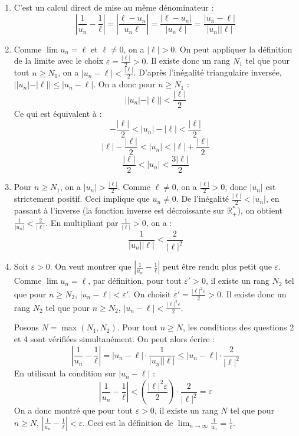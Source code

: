 \documentclass[]{exercices}
\begin{document}
\begin{solution}
	\begin{enumerate}
		\item C'est un calcul direct de mise au même dénominateur :
		      \[ \left|\frac{1}{u_n} - \frac{1}{\ell}\right| = \left|\frac{\ell - u_n}{u_n \ell}\right| = \frac{|\ell - u_n|}{|u_n \ell|} = \frac{|u_n - \ell|}{|u_n||\ell|} \]
		\item Comme $\lim u_n = \ell$ et $\ell \ne 0$, on a $|\ell|>0$. On peut appliquer la définition de la limite avec le choix $\varepsilon = \frac{|\ell|}{2} > 0$.
		      Il existe donc un rang $N_1$ tel que pour tout $n \ge N_1$, on a $|u_n - \ell| < \frac{|\ell|}{2}$.
		      D'après l'inégalité triangulaire inversée, $||u_n|-|\ell|| \le |u_n - \ell|$.
		      On a donc pour $n \ge N_1$ :
		      \[ ||u_n|-|\ell|| < \frac{|\ell|}{2} \]
		      Ce qui est équivalent à :
		      \[ -\frac{|\ell|}{2} < |u_n|-|\ell| < \frac{|\ell|}{2} \]
		      \[ |\ell| - \frac{|\ell|}{2} < |u_n| < |\ell| + \frac{|\ell|}{2} \]
		      \[ \frac{|\ell|}{2} < |u_n| < \frac{3|\ell|}{2} \]
		\item Pour $n \ge N_1$, on a $|u_n| > \frac{|\ell|}{2}$. Comme $\ell \ne 0$, on a $\frac{|\ell|}{2} > 0$, donc $|u_n|$ est strictement positif. Ceci implique que $u_n \ne 0$.
		      De l'inégalité $\frac{|\ell|}{2} < |u_n|$, en passant à l'inverse (la fonction inverse est décroissante sur $\mathbb{R}_+^*$), on obtient $\frac{1}{|u_n|} < \frac{2}{|\ell|}$.
		      En multipliant par $\frac{1}{|\ell|} > 0$, on a :
		      \[ \frac{1}{|u_n||\ell|} < \frac{2}{|\ell|^2} \]
		\item Soit $\varepsilon > 0$. On veut montrer que $|\frac{1}{u_n} - \frac{1}{\ell}|$ peut être rendu plus petit que $\varepsilon$.
		      Comme $\lim u_n = \ell$, par définition, pour tout $\varepsilon' > 0$, il existe un rang $N_2$ tel que pour $n \ge N_2$, $|u_n - \ell| < \varepsilon'$.
		      On choisit $\varepsilon' = \frac{|\ell|^2 \varepsilon}{2} > 0$. Il existe donc un rang $N_2$ tel que pour $n \ge N_2$, $|u_n - \ell| < \frac{|\ell|^2 \varepsilon}{2}$.

		      Posons $N = \max(N_1, N_2)$. Pour tout $n \ge N$, les conditions des questions 2 et 4 sont vérifiées simultanément. On peut alors écrire :
		      \[ \left|\frac{1}{u_n} - \frac{1}{\ell}\right| = |u_n - \ell| \cdot \frac{1}{|u_n||\ell|} \le |u_n - \ell| \cdot \frac{2}{|\ell|^2} \]
		      En utilisant la condition sur $|u_n - \ell|$ :
		      \[ \left|\frac{1}{u_n} - \frac{1}{\ell}\right| < \left(\frac{|\ell|^2 \varepsilon}{2}\right) \cdot \frac{2}{|\ell|^2} = \varepsilon \]
		      On a donc montré que pour tout $\varepsilon > 0$, il existe un rang $N$ tel que pour $n \ge N$, $|\frac{1}{u_n} - \frac{1}{\ell}| < \varepsilon$.
		      Ceci est la définition de $\lim_{n\to\infty} \frac{1}{u_n} = \frac{1}{\ell}$.
	\end{enumerate}
\end{solution}
\end{document}
